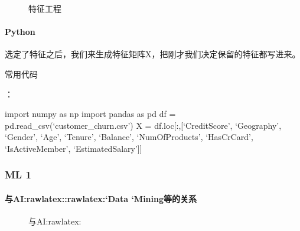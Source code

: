 \documentclass[letterpaper,11pt,english]{sphinxmanual}
\begin{document}
\begin{figure}[H]
\centering
\capstart

\noindent{}
\caption{特征工程}\label{\detokenize{chapter_AI_dive/feature_engineering:id2}}\end{figure}


\paragraph{Python}
\label{\detokenize{chapter_AI_dive/feature_engineering:python}}
选定了特征之后，我们来生成特征矩阵X，把刚才我们决定保留的特征都写进来。

常用代码%
\begin{footnote}[827]\sphinxAtStartFootnote
{}
%
\end{footnote}：

import numpy as np import pandas as pd df =
pd.read\_csv(‘customer\_churn.csv’) X = df.loc{[}:,{[}‘CreditScore’,
‘Geography’, ‘Gender’, ‘Age’, ‘Tenure’, ‘Balance’, ‘NumOfProducts’,
‘HasCrCard’, ‘IsActiveMember’, ‘EstimatedSalary’{]}{]}


\subsubsection{ML 1\sphinxfootnotemark[828]}
\label{\detokenize{chapter_AI_dive/ML:ml-1}}\label{\detokenize{chapter_AI_dive/ML::doc}}%
\begin{footnotetext}[828]\sphinxAtStartFootnote
{}
%
\end{footnotetext}\ignorespaces 

\paragraph{与AI:raw\sphinxhyphen{}latex::raw\sphinxhyphen{}latex:{\color{red}\bfseries{}`}Data {\color{red}\bfseries{}`}Mining等的关系}
\label{\detokenize{chapter_AI_dive/ML:ai-raw-latex-dl-raw-latex-data-mining}}
\begin{figure}[H]
\centering
\capstart

\noindent{}
\caption{与AI:raw\sphinxhyphen{}latex:}\label{\detokenize{chapter_AI_dive/ML:id13}}
\begin{sphinxlegend}\end{sphinxlegend}
\end{figure}
\end{document}
